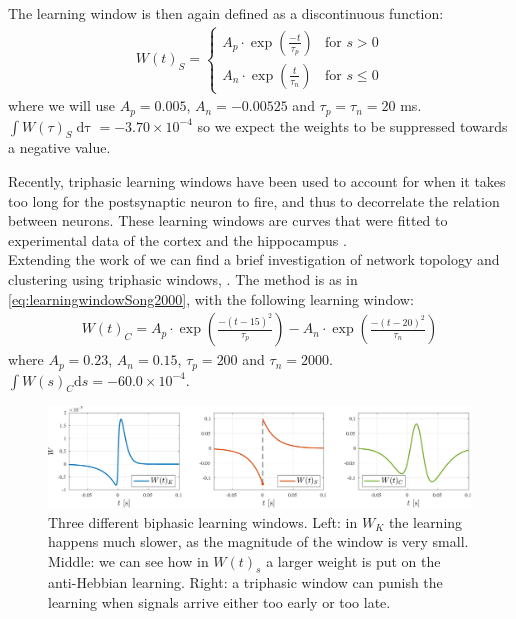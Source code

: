 The learning window is then again defined as a discontinuous function:
\begin{align}
W(t)_S =
\begin{cases}
A_{p} \cdot \exp \left(\frac{-t}{\tau_p}\right) & \text{for } s > 0 \\
A_{n} \cdot \exp \left(\frac{t}{\tau_n}\right)  & \text{for } s \leq 0
\end{cases} \label{eq:learningwindowSong2000}
\end{align}
where we will use $A_p = 0.005$, $A_n = -0.00525$ and $\tau_p = \tau_n = 20$ ms. $\int W(\tau)_S \mathop{d \tau} = -3.70 \times 10^{-4}$ so we expect the weights to be suppressed towards a negative value. 

Recently, triphasic learning windows have been used to account for when it takes too long for the postsynaptic neuron to fire, and thus to decorrelate the relation between neurons. These learning windows are curves that were fitted to experimental data of the cortex and the hippocampus \cite{ChrolCannon2014}. \\

Extending the work of \cite{Song2000} we can find a brief investigation of network topology and clustering using triphasic windows, \cite{ChrolCannon2012}. The method is as in \eqref{eq:learningwindowSong2000}, with the following learning window:
\begin{align}
W(t)_C = A_{p} \cdot \exp \left(\frac{-\left(t - 15 \right)^{2}}{ \tau_{p}}\right) - A_{n} \cdot \exp \left(\frac{-\left(t - 20\right)^{2}}{ \tau_{n}}\right)  \label{eq:learningwindowChrolCannon2012}
\end{align}
where $A_{p}=0.23$, $A_{n}=0.15$, $\tau_{p}=200$ and $\tau_n = 2000$. $\int W(s)_C \mathrm{d}s = -60.0 \times 10^{-4}$.

\begin{figure}[H]
\centering
\includegraphics[width = \textwidth]{../Figures/Learning/LearningWindows.pdf}
\caption{Three different biphasic learning windows. Left: in $W_K$ the learning happens much slower, as the magnitude of the window is very small. Middle: we can see how in $W(t)_s$ a larger weight is put on the anti-Hebbian learning. Right: a triphasic window can punish the learning when signals arrive either too early or too late.}
\label{fig:LearningWindows}
\end{figure}

